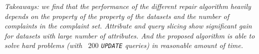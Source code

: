 % 

\smallskip

\textit{Takeaways: we find that the performance of the different repair algorithm 
heavily depends on the property of the property of the datasets and the 
number of complaints in the complaint set. Attribute and query slicing show significant gain for 
datasets with large number of attributes. And the proposed \sys algorithm is able to solve hard problems
(with ~$200$ \texttt{UPDATE} queries) in reasonable amount of time. }














